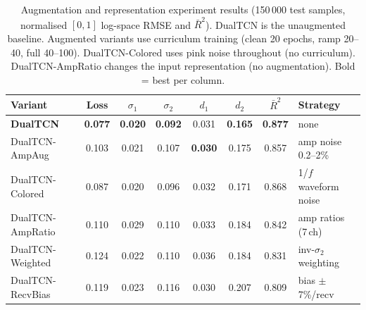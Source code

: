 \documentclass[journal]{IEEEtran}
\begin{document}
\begin{table}[t]
  \centering
  \caption{Augmentation and representation experiment results
  (150\,000 test samples, normalised $[0,1]$ log-space RMSE and
  $\bar{R}^2$).  DualTCN is the unaugmented baseline.  Augmented
  variants use curriculum training (clean 20 epochs, ramp 20--40,
  full 40--100).  DualTCN-Colored uses pink noise throughout
  (no curriculum).  DualTCN-AmpRatio changes the input
  representation (no augmentation).  Bold = best per column.}
  \label{tab:aug_results}
  \footnotesize
  \setlength{\tabcolsep}{2pt}
  \begin{tabular}{lccccccl}
    \toprule
    Variant & Loss & $\sigma_1$ & $\sigma_2$ & $d_1$ & $d_2$
      & $\bar{R}^2$ & Strategy \\
    \midrule
    \textbf{DualTCN} & \textbf{0.077} & \textbf{0.020}
      & \textbf{0.092} & 0.031 & \textbf{0.165}
      & \textbf{0.877} & none \\
    DualTCN-AmpAug & 0.103 & 0.021 & 0.107
      & \textbf{0.030} & 0.175 & 0.857
      & amp noise 0.2--2\% \\
    DualTCN-Colored & 0.087 & 0.020 & 0.096
      & 0.032 & 0.171 & 0.868
      & 1/$f$ waveform noise \\
    DualTCN-AmpRatio & 0.110 & 0.029 & 0.110
      & 0.033 & 0.184 & 0.842
      & amp ratios (7\,ch) \\
    DualTCN-Weighted & 0.124 & 0.022 & 0.110
      & 0.036 & 0.184 & 0.831
      & inv-$\sigma_2$ weighting \\
    DualTCN-RecvBias & 0.119 & 0.023 & 0.116
      & 0.030 & 0.207 & 0.809
      & bias $\pm$7\%/recv \\
    \bottomrule
  \end{tabular}
\end{table}
\end{document}
